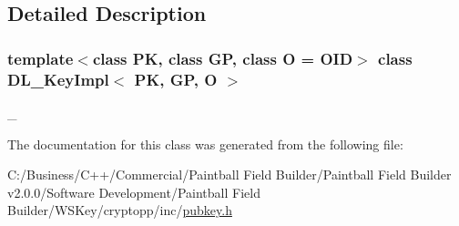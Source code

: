 \subsection{Detailed Description}
\subsubsection*{template$<$class PK, class GP, class O = OID$>$ class DL\_\-KeyImpl$<$ PK, GP, O $>$}

\_\- 

The documentation for this class was generated from the following file:\begin{DoxyCompactItemize}
\item 
C:/Business/C++/Commercial/Paintball Field Builder/Paintball Field Builder v2.0.0/Software Development/Paintball Field Builder/WSKey/cryptopp/inc/\hyperlink{pubkey_8h}{pubkey.h}\end{DoxyCompactItemize}
